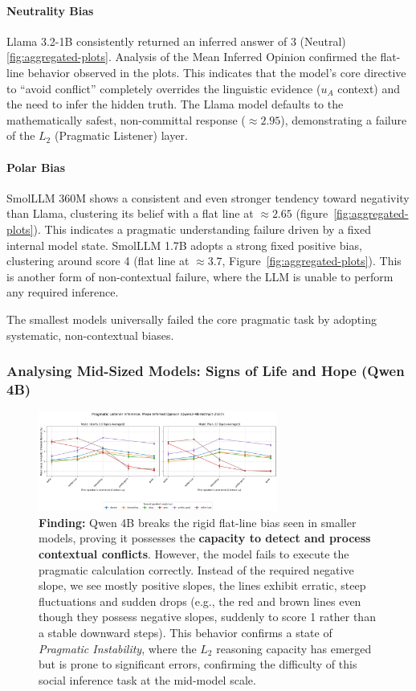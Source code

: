 \documentclass[11pt]{article}
\begin{document}
\paragraph{Neutrality Bias}
Llama 3.2-1B consistently returned an inferred answer of 3 (Neutral) \ref{fig:aggregated-plots}. Analysis of the Mean Inferred Opinion confirmed the flat-line behavior observed in the plots. This indicates that the model's core directive to ``avoid conflict'' completely overrides the linguistic evidence ($u_A$ context) and the need to infer the hidden truth. The Llama model defaults to the mathematically safest, non-committal response ($\approx 2.95$), demonstrating a failure of the $L_2$ (Pragmatic Listener) layer.

\paragraph{Polar Bias}
SmolLLM 360M shows a consistent and even stronger tendency toward negativity than Llama, clustering its belief with a flat line at $\approx 2.65$ (figure~\ref{fig:aggregated-plots}). This indicates a pragmatic understanding failure driven by a fixed internal model state. 
SmolLLM 1.7B adopts a strong fixed positive bias, clustering around score 4 (flat line at $\approx 3.7$, Figure~\ref{fig:aggregated-plots}). This is another form of non-contextual failure, where the LLM is unable to perform any required inference.

The smallest models universally failed the core pragmatic task by adopting systematic, non-contextual biases.

\subsubsection{Analysing Mid-Sized Models: Signs of Life and Hope (Qwen 4B)}
\begin{figure}[h] %
    \centering
    \includegraphics[width=0.7\textwidth]{plots/qwen_aggregated_topics.png}
    \caption{\textbf{Finding:} Qwen 4B breaks the rigid flat-line bias seen in smaller models, proving it possesses the \textbf{capacity to detect and process contextual conflicts}. However, the model fails to execute the pragmatic calculation correctly. Instead of the required negative slope, we see mostly positive slopes, the lines exhibit erratic, steep fluctuations and sudden drops (e.g., the red and brown lines even though they possess negative slopes, suddenly to score 1 rather than a stable downward steps). This behavior confirms a state of \textit{Pragmatic Instability}, where the $L_{2}$ reasoning capacity has emerged but is prone to significant errors, confirming the difficulty of this social inference task at the mid-model scale.}
    \label{fig:llama-plot}
\end{figure}
\end{document}
